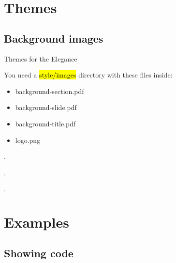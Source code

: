 



\hypersetup{pdfpagemode=FullScreen}
\maketitle
\section{Themes}

\subsection{Background images}

\begin{xframe}{Themes for the Elegance}

    You need a \hl{style/images} directory
    with these files inside:

    \begin{itemize}
        \item background-section.pdf
        \item background-slide.pdf
        \item background-title.pdf
        \item logo.png
    \end{itemize}

\end{xframe}


{
\begin{frame}[plain]
    .
\end{frame}
}


{
\begin{frame}[plain]
    .
\end{frame}
}


{
\begin{frame}[plain]
    .
\end{frame}
}





\section{Examples}

\subsection{Showing code}

